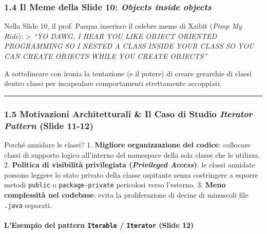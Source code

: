 \documentclass[11pt,a4paper]{article}
\newcommand{\passthrough}[1]{#1}
\begin{document}
\subsubsection{\texorpdfstring{1.4 Il Meme della Slide 10: \emph{Objects
inside
objects}}{1.4 Il Meme della Slide 10: Objects inside objects}}\label{il-meme-della-slide-10-objects-inside-objects}

Nella Slide 10, il prof. Pasqua inserisce il celebre meme di Xzibit
(\emph{Pimp My Ride}): \textgreater{} \emph{``YO DAWG, I HEAR YOU LIKE
OBJECT ORIENTED PROGRAMMING SO I NESTED A CLASS INSIDE YOUR CLASS SO YOU
CAN CREATE OBJECTS WHILE YOU CREATE OBJECTS''}

A sottolineare con ironia la tentazione (e il potere) di creare
gerarchie di classi dentro classi per incapsulare comportamenti
strettamente accoppiati.

\begin{center}\rule{0.5\linewidth}{0.5pt}\end{center}

\subsubsection{\texorpdfstring{1.5 Motivazioni Architetturali \& Il Caso
di Studio \emph{Iterator Pattern} (Slide
11-12)}{1.5 Motivazioni Architetturali \& Il Caso di Studio Iterator Pattern (Slide 11-12)}}\label{motivazioni-architetturali-il-caso-di-studio-iterator-pattern-slide-11-12}

Perché annidare le classi? 1. \textbf{Migliore organizzazione del
codice}: collocare classi di supporto logico all'interno del namespace
della sola classe che le utilizza. 2. \textbf{Politica di visibilità
privilegiata (\emph{Privileged Access})}: le classi annidate possono
leggere lo stato privato della classe ospitante senza costringere a
esporre metodi \passthrough{\lstinline!public!} o
\passthrough{\lstinline!package-private!} pericolosi verso l'esterno. 3.
\textbf{Meno complessità nel codebase}: evita la proliferazione di
decine di minuscoli file \passthrough{\lstinline!.java!} separati.

\paragraph{\texorpdfstring{L'Esempio del pattern \texttt{Iterable} /
\texttt{Iterator} (Slide
12)}{L'Esempio del pattern Iterable / Iterator (Slide 12)}}\label{lesempio-del-pattern-iterable-iterator-slide-12}
\end{document}
